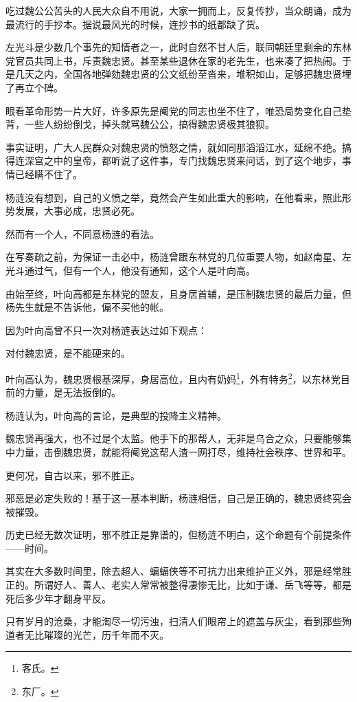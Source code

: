\begin{multicols}{\theparacolNo}
吃过魏公公苦头的人民大众自不用说，大家一拥而上，反复传抄，当众朗诵，成为最流行的手抄本。据说最风光的时候，连抄书的纸都缺了货。

左光斗是少数几个事先的知情者之一，此时自然不甘人后，联同朝廷里剩余的东林党官员共同上书，斥责魏忠贤。甚至某些退休在家的老先生，也来凑了把热闹。于是几天之内，全国各地弹劾魏忠贤的公文纸纷至沓来，堆积如山，足够把魏忠贤埋了再立个碑。

眼看革命形势一片大好，许多原先是阉党的同志也坐不住了，唯恐局势变化自己垫背，一些人纷纷倒戈，掉头就骂魏公公，搞得魏忠贤极其狼狈。

事实证明，广大人民群众对魏忠贤的愤怒之情，就如同那滔滔江水，延绵不绝。搞得连深宫之中的皇帝，都听说了这件事，专门找魏忠贤来问话，到了这个地步，事情已经瞒不住了。

杨涟没有想到，自己的义愤之举，竟然会产生如此重大的影响，在他看来，照此形势发展，大事必成，忠贤必死。

然而有一个人，不同意杨涟的看法。

在写奏疏之前，为保证一击必中，杨涟曾跟东林党的几位重要人物，如赵南星、左光斗通过气，但有一个人，他没有通知，这个人是叶向高。

由始至终，叶向高都是东林党的盟友，且身居首辅，是压制魏忠贤的最后力量，但杨先生就是不告诉他，偏不买他的帐。

因为叶向高曾不只一次对杨涟表达过如下观点：

对付魏忠贤，是不能硬来的。

叶向高认为，魏忠贤根基深厚，身居高位，且内有奶妈\footnote{客氏。}，外有特务\footnote{东厂。}，以东林党目前的力量，是无法扳倒的。

杨涟认为，叶向高的言论，是典型的投降主义精神。

魏忠贤再强大，也不过是个太监。他手下的那帮人，无非是乌合之众，只要能够集中力量，击倒魏忠贤，就能将阉党这帮人渣一网打尽，维持社会秩序、世界和平。

更何况，自古以来，邪不胜正。

邪恶是必定失败的！基于这一基本判断，杨涟相信，自己是正确的，魏忠贤终究会被摧毁。

历史已经无数次证明，邪不胜正是靠谱的，但杨涟不明白，这个命题有个前提条件——时间。

其实在大多数时间里，除去超人、蝙蝠侠等不可抗力出来维护正义外，邪是经常胜正的。所谓好人、善人、老实人常常被整得凄惨无比，比如于谦、岳飞等等，都是死后多少年才翻身平反。

只有岁月的沧桑，才能淘尽一切污浊，扫清人们眼帘上的遮盖与灰尘，看到那些殉道者无比璀璨的光芒，历千年而不灭。


\end{multicols}
